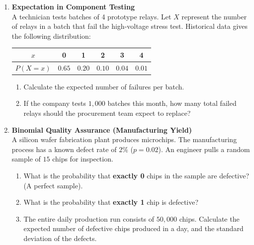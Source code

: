 \begin{enumerate}[label=\textbf{Q\arabic*.}, leftmargin=*, start=4]

    \item \textbf{Expectation in Component Testing} \\
    A technician tests batches of 4 prototype relays. Let $X$ represent the number of relays in a batch that fail the high-voltage stress test. Historical data gives the following distribution:
    \begin{center}
    \begin{tabular}{|c|c|c|c|c|c|}
    \hline
    $x$ & 0 & 1 & 2 & 3 & 4 \\ \hline
    $P(X=x)$ & $0.65$ & $0.20$ & $0.10$ & $0.04$ & $0.01$ \\ \hline
    \end{tabular}
    \end{center}
    \begin{enumerate}[label=\arabic*.]
        \item Calculate the expected number of failures per batch.
        \item If the company tests $1,000$ batches this month, how many total failed relays should the procurement team expect to replace?
    \end{enumerate}
    \vspace{0.3cm}

    \item \textbf{Binomial Quality Assurance (Manufacturing Yield)} \\
    A silicon wafer fabrication plant produces microchips. The manufacturing process has a known defect rate of $2\%$ ($p = 0.02$). An engineer pulls a random sample of $15$ chips for inspection.
    \begin{enumerate}[label=\arabic*.]
        \item What is the probability that \textbf{exactly 0} chips in the sample are defective? (A perfect sample).
        \item What is the probability that \textbf{exactly 1} chip is defective?
        \item The entire daily production run consists of $50,000$ chips. Calculate the expected number of defective chips produced in a day, and the standard deviation of the defects.
    \end{enumerate}
    \vspace{0.3cm}


\end{enumerate}
